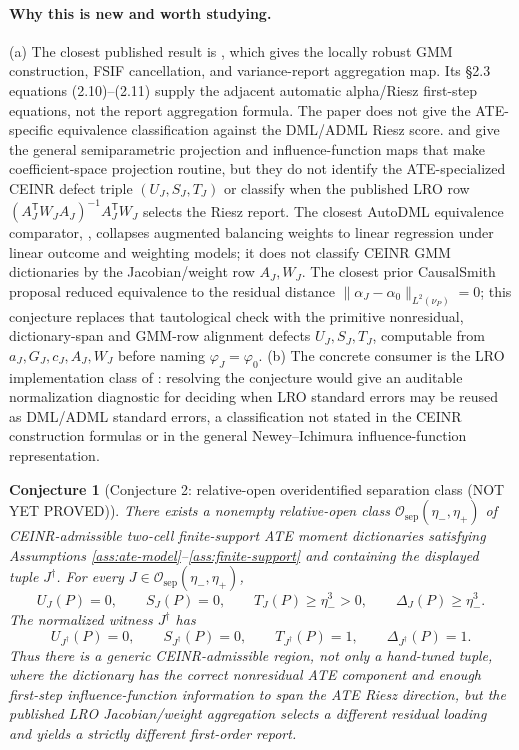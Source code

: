 \documentclass[11pt]{article}
\newcommand{\transpose}{\mathsf{T}}
\theoremstyle{definition}
\theoremstyle{plain}
\newtheorem{conjecture}{Conjecture}
\theoremstyle{remark}
\begin{document}
\paragraph{Why this is new and worth studying.}
(a) The closest published result is
\citet[\S2, eqs.\ (2.2)--(2.3), and \S2, eq.\ (2.8)]{ChernozhukovEscancianoIchimuraNeweyRobins2022LRO}, which gives
the locally robust GMM construction, FSIF cancellation, and variance-report
aggregation map.  Its \S2.3 equations (2.10)--(2.11) supply the adjacent
automatic alpha/Riesz first-step equations, not the report aggregation formula.
The paper does not give the ATE-specific equivalence classification against
the DML/ADML Riesz score.  \citet[\S3--\S4]{Newey1994Econometrica} and
\citet[\S2--\S4]{IchimuraNewey2022QE} give the general semiparametric
projection and influence-function maps that make coefficient-space projection
routine, but they do not identify the ATE-specialized CEINR defect triple
\((U_J,S_J,T_J)\) or classify when the published LRO row
\((A_J^\transpose W_JA_J)^{-1}A_J^\transpose W_J\) selects the Riesz report.
The closest AutoDML equivalence comparator,
\citet[\S2--\S3]{BrunsSmithDukesFellerOgburn2025ABW}, collapses augmented
balancing weights to linear regression under linear outcome and weighting
models; it does not classify CEINR GMM dictionaries by the Jacobian/weight row
\(A_J,W_J\).  The closest prior CausalSmith proposal reduced equivalence to the
residual distance \(\|\alpha_J-\alpha_0\|_{L^2(\nu_P)}=0\); this conjecture
replaces that tautological check with the primitive nonresidual, dictionary-span
and GMM-row alignment defects \(U_J,S_J,T_J\), computable from
\(a_J,G_J,c_J,A_J,W_J\) before naming \(\varphi_J=\varphi_0\).  (b) The
concrete consumer is the LRO
implementation class of
\citet{ChernozhukovEscancianoIchimuraNeweyRobins2022LRO}: resolving the
conjecture would give an auditable normalization diagnostic for deciding when
LRO standard errors may be reused as DML/ADML standard errors, a classification
not stated in the CEINR construction formulas or in the general
Newey--Ichimura influence-function representation.

\begin{conjecture}[Conjecture 2: relative-open overidentified separation class (NOT YET PROVED)]\label{conj:witness}
There exists a nonempty relative-open class
\(\mathcal O_{\mathrm{sep}}(\eta_-,\eta_+)\) of CEINR-admissible two-cell
finite-support ATE moment dictionaries satisfying Assumptions
\ref{ass:ate-model}--\ref{ass:finite-support} and containing the displayed
tuple \(J^\dagger\).  For every
\(J\in\mathcal O_{\mathrm{sep}}(\eta_-,\eta_+)\),
\[
U_J(P)=0,\qquad S_J(P)=0,\qquad T_J(P)\ge \eta_-^3>0,\qquad
\Delta_J(P)\ge \eta_-^3.
\]
The normalized witness \(J^\dagger\) has
\[
U_{J^\dagger}(P)=0,\qquad S_{J^\dagger}(P)=0,\qquad T_{J^\dagger}(P)=1,\qquad
\Delta_{J^\dagger}(P)=1.
\]
Thus there is a generic CEINR-admissible region, not only a hand-tuned tuple,
where the dictionary has the correct nonresidual ATE component and enough
first-step influence-function information to span the ATE Riesz direction, but
the published LRO Jacobian/weight aggregation selects a different residual
loading and yields a strictly different first-order report.
\end{conjecture}
\end{document}
